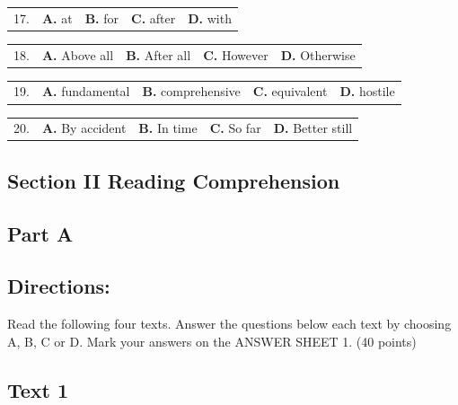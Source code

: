 \documentclass[UTF8,11pt]{ctexart}
\begin{document}
\noindent\begin{tabularx}{\linewidth}{@{}lXXXX@{}}17. & \textbf{A.} at & \textbf{B.} for & \textbf{C.} after & \textbf{D.} with\\\end{tabularx}\par

\noindent\begin{tabularx}{\linewidth}{@{}lXXXX@{}}18. & \textbf{A.} Above all & \textbf{B.} After all & \textbf{C.} However & \textbf{D.} Otherwise\\\end{tabularx}\par

\noindent\begin{tabularx}{\linewidth}{@{}lXXXX@{}}19. & \textbf{A.} fundamental & \textbf{B.} comprehensive & \textbf{C.} equivalent & \textbf{D.} hostile\\\end{tabularx}\par

\noindent\begin{tabularx}{\linewidth}{@{}lXXXX@{}}20. & \textbf{A.} By accident & \textbf{B.} In time & \textbf{C.} So far & \textbf{D.} Better still\\\end{tabularx}\par

\subsection*{\textbf{Section II Reading Comprehension}}


\subsection*{\textbf{Part A}}


\subsection*{\textbf{Directions:}}


Read the following four texts. Answer the questions below each text by choosing A, B, C or D. Mark your answers on the ANSWER SHEET 1. (40 points)


\subsection*{\textbf{Text 1}}
\end{document}
